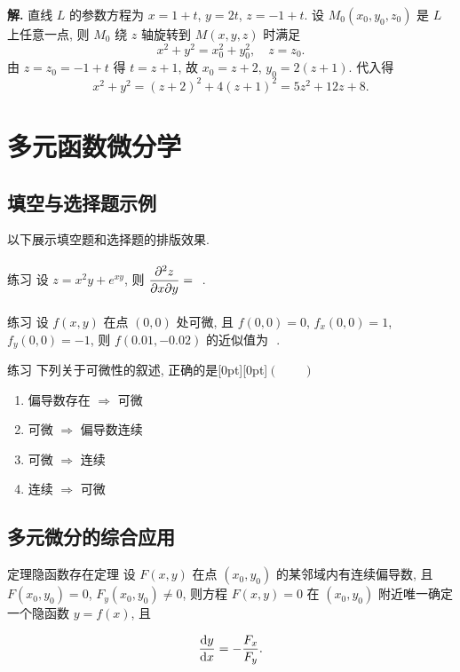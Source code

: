\documentclass[a4paper,12pt,oneside,fontset=none]{ctexbook}
\let\olddfrac\dfrac
\renewcommand{\dfrac}[2]{
	\olddfrac{#1\vrule width 0pt height 1.15em depth 0em}{#2\vrule width 0pt height 0em depth 0.6em}
}
\newcommand{\fillin}[1][3cm]{\,\underline{\hspace{#1}}\,}
\newcommand{\selectbracket}{\unskip\nolinebreak\quad \raisebox{0.7pt}[0pt][0pt]{\mbox{$(\qquad)$}}\par}
\newcounter{theorem}[chapter]
\newenvironment{theorem}[1][]{\begin{thmBox}{定理}{#1}}{\end{thmBox}}
\newenvironment{exercise}[1][]{\begin{exBox}{练习}{#1}}{\end{exBox}}
\numberwithin{equation}{chapter}
\begin{document}
	\textbf{解.} 直线 $L$ 的参数方程为 $x = 1 + t$, $y = 2t$, $z = -1 + t$. 设 $M_0(x_0, y_0, z_0)$ 是 $L$ 上任意一点, 则 $M_0$ 绕 $z$ 轴旋转到 $M(x, y, z)$ 时满足
	\[
	x^2 + y^2 = x_0^2 + y_0^2, \quad z = z_0.
	\]
	由 $z = z_0 = -1 + t$ 得 $t = z + 1$, 故 $x_0 = z + 2$, $y_0 = 2(z+1)$. 代入得
	\[
	x^2 + y^2 = (z+2)^2 + 4(z+1)^2 = 5z^2 + 12z + 8.
	\]
	
	\chapter{多元函数微分学}
	
	\section{填空与选择题示例}
	
	以下展示填空题和选择题的排版效果.
	
	\begin{exercise}
		设 $z = x^2y + e^{xy}$, 则 $\dfrac{\partial^2 z}{\partial x \partial y} = $ \fillin[4cm].
	\end{exercise}
	
	\begin{exercise}
		设 $f(x,y)$ 在点 $(0,0)$ 处可微, 且 $f(0,0) = 0$, $f_x(0,0) = 1$, $f_y(0,0) = -1$, 则 $f(0.01, -0.02)$ 的近似值为 \fillin.
	\end{exercise}
	
	\begin{exercise}
		下列关于可微性的叙述, 正确的是\selectbracket
		\begin{enumerate}
			\item[A.] 偏导数存在 $\Longrightarrow$ 可微
			\item[B.] 可微 $\Longrightarrow$ 偏导数连续
			\item[C.] 可微 $\Longrightarrow$ 连续
			\item[D.] 连续 $\Longrightarrow$ 可微
		\end{enumerate}
	\end{exercise}
	
	\section{多元微分的综合应用}
	
	\begin{theorem}[隐函数存在定理]
		设 $F(x, y)$ 在点 $(x_0, y_0)$ 的某邻域内有连续偏导数, 且 $F(x_0, y_0) = 0$, $F_y(x_0, y_0) \neq 0$, 则方程 $F(x,y) = 0$ 在 $(x_0, y_0)$ 附近唯一确定一个隐函数 $y = f(x)$, 且
		\[
		\dfrac{\mathrm{d}y}{\mathrm{d}x} = -\dfrac{F_x}{F_y}.
		\]
	\end{theorem}
	
\end{document}
